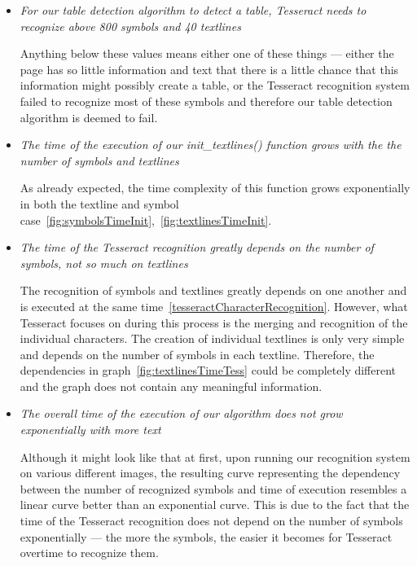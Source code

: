 \begin{itemize}
    \item \emph{For our table detection algorithm to detect a table, Tesseract needs to recognize above 800 symbols and 40 textlines}
    
    Anything below these values means either one of these things --- either the page has so little information and text that there is a little chance that this information might possibly create a table, or the Tesseract recognition system failed to recognize most of these symbols and therefore our table detection algorithm is deemed to fail.

    \item \emph{The time of the execution of our init\_textlines() function grows with the the number of symbols and textlines}
    
    As already expected, the time complexity of this function grows exponentially in both the textline and symbol case~\cref{fig:symbolsTimeInit},~\cref{fig:textlinesTimeInit}.

    \item \emph{The time of the Tesseract recognition greatly depends on the number of symbols, not so much on textlines}
    
    The recognition of symbols and textlines greatly depends on one another and is executed at the same time~\cref{tesseractCharacterRecognition}. However, what Tesseract focuses on during this process is the merging and recognition of the individual characters. The creation of individual textlines is only very simple and depends on the number of symbols in each textline. Therefore, the dependencies in graph~\cref{fig:textlinesTimeTess} could be completely different and the graph does not contain any meaningful information.
    
    \item \emph{The overall time of the execution of our algorithm does not grow exponentially with more text}
    
    Although it might look like that at first, upon running our recognition system on various different images, the resulting curve representing the dependency between the number of recognized symbols and time of execution resembles a linear curve better than an exponential curve. This is due to the fact that the time of the Tesseract recognition does not depend on the number of symbols exponentially --- the more the symbols, the easier it becomes for Tesseract overtime to recognize them.
    
\end{itemize}

